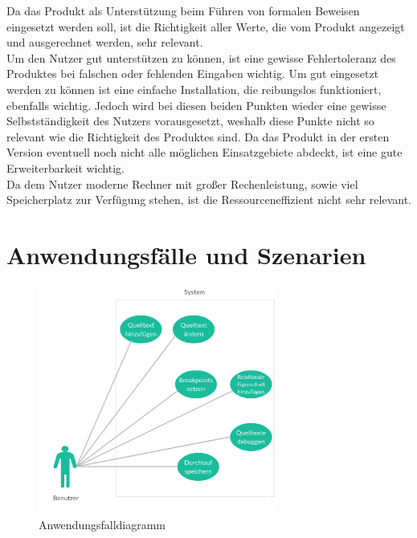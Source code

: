 \documentclass[parskip=full]{scrartcl}
\begin{document}
Da das Produkt als Unterstützung beim Führen von formalen Beweisen eingesetzt werden soll, ist die Richtigkeit aller Werte, die vom Produkt angezeigt und ausgerechnet werden, sehr relevant. \\
Um den Nutzer gut unterstützen zu können, ist eine gewisse Fehlertoleranz des Produktes bei falschen oder fehlenden Eingaben wichtig. Um gut eingesetzt werden zu können ist eine einfache Installation, die reibungslos funktioniert, ebenfalls wichtig. Jedoch wird bei diesen beiden Punkten wieder eine gewisse Selbstständigkeit des Nutzers vorausgesetzt, weshalb diese Punkte nicht so relevant wie die Richtigkeit des Produktes sind.
Da das Produkt in der ersten Version eventuell noch nicht alle möglichen Einsatzgebiete abdeckt, ist eine gute Erweiterbarkeit wichtig. \\
Da dem Nutzer moderne Rechner mit großer Rechenleistung, sowie viel Speicherplatz zur Verfügung stehen, ist die Ressourceneffizient nicht sehr relevant. 
 

\newpage
\section{Anwendungsfälle und Szenarien}
\begin{figure}[h] 
  \centering
     \includegraphics[width=0.7\textwidth]{Anwendungsfalldiagramm}
  \caption{Anwendungsfalldiagramm}
  \label{fig:Bild1}
\end{figure}
\end{document}
